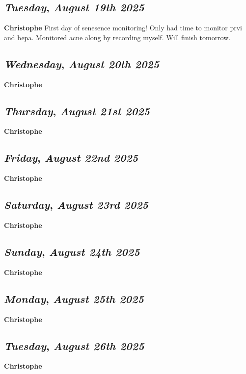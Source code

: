 \def\day{\textit{August 19th 2025}}
\def\weekday{\textit{Tuesday}}
\subsection*{\weekday, \day}
\textbf {Christophe}
First day of senesence monitoring! Only had time to monitor prvi and bepa. Monitored acne along by recording myself. Will finish tomorrow. 

\def\day{\textit{August 20th 2025}}
\def\weekday{\textit{Wednesday}}
\subsection*{\weekday, \day}
\textbf {Christophe}

\def\day{\textit{August 21st 2025}}
\def\weekday{\textit{Thursday}}
\subsection*{\weekday, \day}
\textbf {Christophe}

\def\day{\textit{August 22nd 2025}}
\def\weekday{\textit{Friday}}
\subsection*{\weekday, \day}
\textbf {Christophe}

\def\day{\textit{August 23rd 2025}}
\def\weekday{\textit{Saturday}}
\subsection*{\weekday, \day}
\textbf {Christophe}

\def\day{\textit{August 24th 2025}}
\def\weekday{\textit{Sunday}}
\subsection*{\weekday, \day}
\textbf {Christophe}

\def\day{\textit{August 25th 2025}}
\def\weekday{\textit{Monday}}
\subsection*{\weekday, \day}
\textbf {Christophe}

\def\day{\textit{August 26th 2025}}
\def\weekday{\textit{Tuesday}}
\subsection*{\weekday, \day}
\textbf {Christophe}

